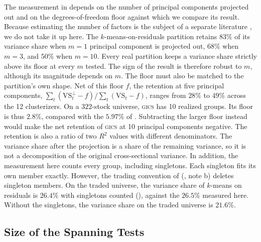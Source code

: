The measurement in  depends on the number of principal components projected
out and on the degrees-of-freedom floor against which we compare its result. Because estimating the number of factors is the subject of a separate literature \citep{bai2002determining,
onatski2010determining, ahn2013eigenvalue}, we do not take it up here.
The $k$-means-on-residuals partition retains $83\%$ of its variance share when $m = 1$ principal component is projected out, $68\%$ when $m = 3$, and $50\%$ when $m = 10$. Every real partition keeps a variance share strictly above its floor at every $m$ tested. The sign of the result is therefore robust to $m$, although its magnitude depends on $m$. The floor must also be matched to the partition's own shape. Net of this floor $f$, the retention at five principal components, $\sum_t(\mathrm{VS}^{\perp}_t - f)/\sum_t(\mathrm{VS}_t - f)$, ranges from $28\%$ to $49\%$ across the 12 clusterizers. On a $322$-stock universe, \textsc{gics} has 10 realized groups. Its floor is thus $2.8\%$, compared with the $5.97\%$ of . Subtracting the larger floor instead would make the net retention of \textsc{gics} at 10 principal components negative. The retention is also a ratio of two $R^2$ values with different denominators. The variance share after the projection is a share of the remaining variance, so it is not a decomposition of the original cross-sectional variance. In addition, the measurement here counts every group, including singletons. Each singleton fits its own member exactly. However, the trading convention of  (, note b) deletes singleton members. On the traded universe, the variance share of $k$-means on residuals is $26.4\%$ with singletons counted (), against the $26.5\%$ measured here. Without the singletons, the variance share on the traded universe is $21.6\%$.

\subsection{Size of the Spanning Tests}
\label{app:size}

